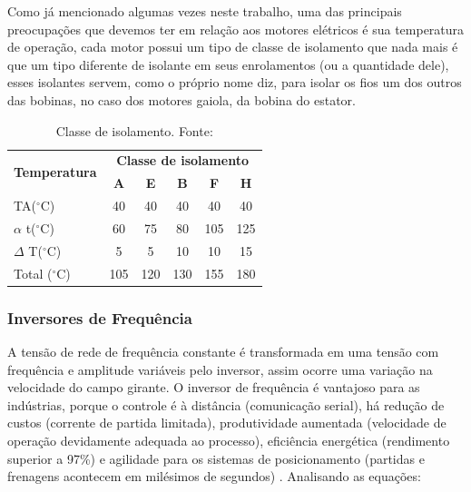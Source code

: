 Como já mencionado algumas vezes neste trabalho, uma das principais preocupações que devemos ter em relação aos motores 
elétricos é sua temperatura de operação, cada motor possui um tipo de classe de isolamento que nada mais é que um tipo diferente 
de isolante em seus enrolamentos (ou a quantidade dele), esses isolantes servem, como o próprio nome diz, para isolar os fios um 
dos outros das bobinas, no caso dos motores gaiola, da bobina do estator.\cite{WEG_catalogo}

\begin{table}[H]
\centering
\caption{Classe de isolamento. Fonte:\cite{WEG_catalogo}}
\label{isolamento}
\begin{tabular}{|l|c|c|c|c|c|}
\hline
\multicolumn{1}{|r|}{\multirow{2}{*}{\textbf{Temperatura}}} & \multicolumn{5}{c|}{\textbf{Classe de isolamento}}             \\ \cline{2-6}
\multicolumn{1}{|r|}{}                                      & \textbf{A} & \textbf{E} & \textbf{B} & \textbf{F} & \textbf{H} \\ \hline
TA($^{\circ}$C)                                                      & 40         & 40         & 40         & 40         & 40         \\ \hline
$\alpha$ t($^{\circ}$C)                                              & 60         & 75         & 80         & 105        & 125        \\ \hline
$\Delta$ T($^{\circ}$C)                                              & 5          & 5          & 10         & 10         & 15         \\ \hline
Total ($^{\circ}$C)                                                  & 105        & 120        & 130        & 155        & 180        \\ \hline
\end{tabular}
\end{table}

\vfill
\pagebreak


\subsubsection*{\textbf{Inversores de Frequência}}

A tensão de rede de frequência constante é transformada em uma tensão com frequência e amplitude variáveis pelo inversor, 
assim ocorre uma variação na velocidade do campo girante. O inversor de frequência é vantajoso para as indústrias, porque o 
controle é à distância (comunicação serial), há redução de custos (corrente de partida limitada), produtividade aumentada 
(velocidade de operação devidamente adequada ao processo), eficiência energética (rendimento superior a 97\%) e agilidade para 
os sistemas de posicionamento (partidas e frenagens acontecem em milésimos de segundos) \cite{WEG2}.
    Analisando as equações:

